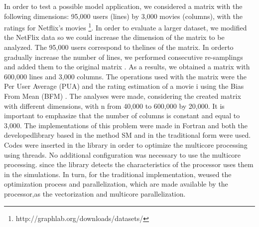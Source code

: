 \documentclass[10pt]{article}
\begin{document}
In order to test a possible model application, we considered a matrix with the following dimensions: 95,000 users 
(lines) by 3,000 movies (columns), with the ratings for Netflix’s movies
\footnote{http://graphlab.org/downloads/datasets/}. In order to evaluate a larger dataset, we modified the 
NetFlix data so we could increase the dimension of the matrix to be analyzed. The 95,000 users correspond to 
thelines of the matrix. In orderto gradually increase the number of lines, we performed consecutive re-samplings 
and added them to the original matrix . As a results, we obtained a  matrix with 600,000 lines and 3,000 columns. 
The operations used with the matrix were the Per User Average (PUA) and the rating estimation of a movie i using 
the Bias From Mean (BFM) \cite{cf}. The analyses were  made, considering the created matrix with different dimensions, 
with n from 40,000 to 600,000 by 20,000. It is important to emphasize that the number of columns is constant and 
equal to 3,000. The implementations of this problem were made in Fortran and both the developedlibrary based in 
the method SM and in the traditional form were used. Codes were inserted in the library in order to optimize the 
multicore processing using threads. No additional configuration was necessary to use the multicore processing. 
since the library detects the characteristics of the processor uses them in the simulations. In turn, for the 
traditional implementation, weused the optimization process and parallelization, which are made available by 
the processor,as the vectorization and multicore parallelization.
\end{document}
